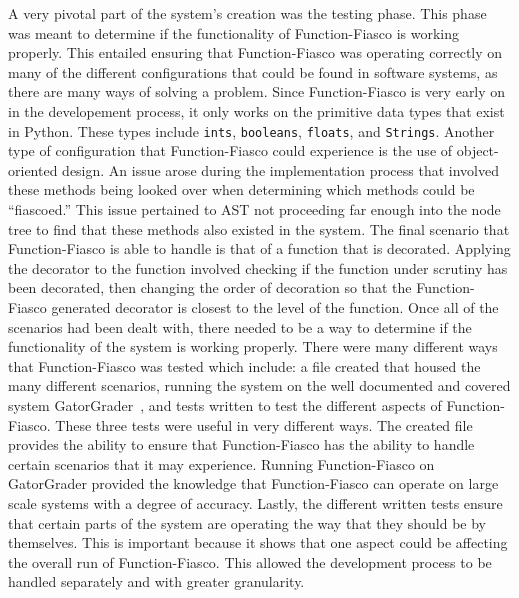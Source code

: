 A very pivotal part of the system's creation was the testing phase. This phase was meant to determine if the functionality of Function-Fiasco is working properly. This entailed ensuring that Function-Fiasco was operating correctly on many of the different configurations that could be found in software systems, as there are many ways of solving a problem. Since Function-Fiasco is very early on in the developement process, it only works on the primitive data types that exist in Python. These types include \texttt{ints}, \texttt{booleans}, \texttt{floats}, and \texttt{Strings}. Another type of configuration that Function-Fiasco could experience is the use of object-oriented design. An issue arose during the implementation process that involved these methods being looked over when determining which methods could be ``fiascoed.'' This issue pertained to AST not proceeding far enough into the node tree to find that these methods also existed in the system. The final scenario that Function-Fiasco is able to handle is that of a function that is decorated. Applying the decorator to the function involved checking if the function under scrutiny has been decorated, then changing the order of decoration so that the Function-Fiasco generated decorator is closest to the level of the function. Once all of the scenarios had been dealt with, there needed to be a way to determine if the functionality of the system is working properly. There were many different ways that Function-Fiasco was tested which include: a file created that housed the many different scenarios, running the system on the well documented and covered system GatorGrader~\cite{Gat}, and tests written to test the different aspects of Function-Fiasco. These three tests were useful in very different ways. The created file provides the ability to ensure that Function-Fiasco has the ability to handle certain scenarios that it may experience. Running Function-Fiasco on GatorGrader provided the knowledge that Function-Fiasco can operate on large scale systems with a degree of accuracy. Lastly, the different written tests ensure that certain parts of the system are operating the way that they should be by themselves. This is important because it shows that one aspect could be affecting the overall run of Function-Fiasco. This allowed the development process to be handled separately and with greater granularity.

